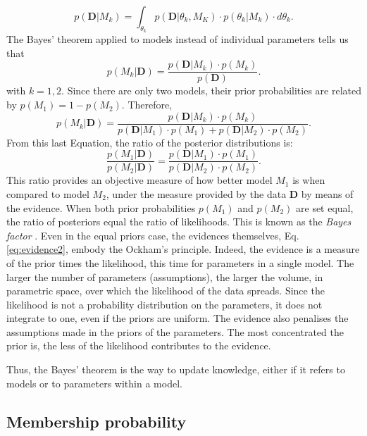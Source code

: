  \begin{equation}
p(\mathbf{D}|M_k)=\int_{\theta_k} p(\mathbf{D}|\theta_k,M_K)\cdot p(\theta_k|M_k)\cdot d\theta_k. \label{eq:evidence2}
\end{equation}
The Bayes' theorem applied to models instead of individual parameters tells us that
\begin{equation}
p(M_k|\mathbf{D})=\frac{p(\mathbf{D}|M_k)\cdot p(M_k)}{p(\mathbf{D})}.
\end{equation}
with $k=1,2$. Since there are only two models, their prior probabilities are related by $p(M_1)= 1- p(M_2)$. Therefore,
 \begin{equation}
p(M_k|\mathbf{D})=\frac{p(\mathbf{D}|M_k)\cdot p(M_k)}{p(\mathbf{D}|M_1)\cdot p(M_1)+p(\mathbf{D}|M_2)\cdot p(M_2)}.
\end{equation}
From this last Equation, the ratio of the posterior distributions is:
\begin{equation}
\frac{p(M_1|\mathbf{D})}{p(M_2|\mathbf{D})}=\frac{p(\mathbf{D}|M_1)\cdot p(M_1)}{p(\mathbf{D}|M_2)\cdot p(M_2)}.
\end{equation}
This ratio provides an objective measure of how better model $M_1$ is when compared to model $M_2$, under the measure provided by the data $\mathbf{D}$ by means of the evidence. When both prior probabilities  $p(M_1)$ and $p(M_2)$ are set equal, the ratio of posteriors equal the ratio of likelihoods. This is known as the \emph{Bayes factor} \cite[for a similar derivation and some examples of its application see][]{Kaas1995}. Even in the equal priors case, the evidences themselves, Eq. \ref{eq:evidence2}, embody the Ockham's principle. Indeed, the evidence is a measure of the prior times the likelihood, this time for parameters in a single model. The larger the number of parameters (assumptions), the larger the volume, in parametric space, over which the likelihood of the data spreads. Since the likelihood is not a probability distribution on the parameters, it does not integrate to one, even if the priors are uniform. The evidence also penalises the assumptions made in the priors of the parameters. The most concentrated the prior is, the less of the likelihood contributes to the evidence.

Thus, the Bayes' theorem is the way to update knowledge, either if it refers to models or to parameters within a model. 

\subsection{Membership probability}

